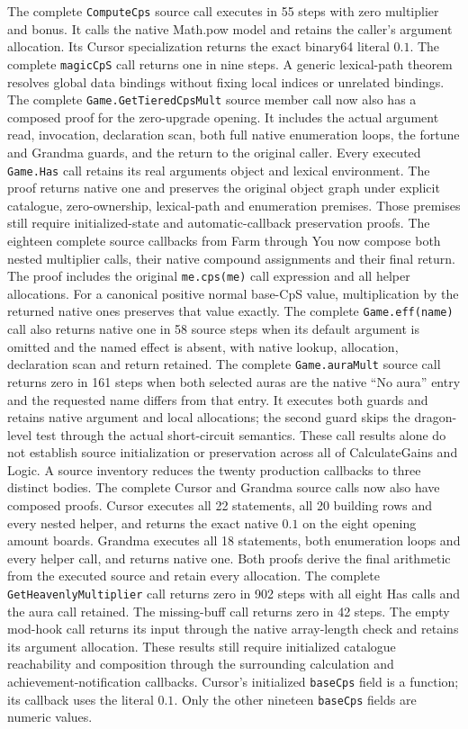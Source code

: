 \documentclass[11pt,a4paper]{article}
\numberwithin{equation}{section}
\theoremstyle{definition}
\theoremstyle{remark}
\begin{document}
The complete \texttt{ComputeCps} source call executes in 55 steps with zero multiplier and bonus. It calls the native Math.pow model and retains the caller's argument allocation. Its Cursor specialization returns the exact binary64 literal $0.1$. The complete \texttt{magicCpS} call returns one in nine steps. A generic lexical-path theorem resolves global data bindings without fixing local indices or unrelated bindings. The complete \texttt{Game.GetTieredCpsMult} source member call now also has a composed proof for the zero-upgrade opening. It includes the actual argument read, invocation, declaration scan, both full native enumeration loops, the fortune and Grandma guards, and the return to the original caller. Every executed \texttt{Game.Has} call retains its real arguments object and lexical environment. The proof returns native one and preserves the original object graph under explicit catalogue, zero-ownership, lexical-path and enumeration premises. Those premises still require initialized-state and automatic-callback preservation proofs. The eighteen complete source callbacks from Farm through You now compose both nested multiplier calls, their native compound assignments and their final return. The proof includes the original \texttt{me.cps(me)} call expression and all helper allocations. For a canonical positive normal base-CpS value, multiplication by the returned native ones preserves that value exactly. The complete \texttt{Game.eff(name)} call also returns native one in 58 source steps when its default argument is omitted and the named effect is absent, with native lookup, allocation, declaration scan and return retained. The complete \texttt{Game.auraMult} source call returns zero in 161 steps when both selected auras are the native ``No aura'' entry and the requested name differs from that entry. It executes both guards and retains native argument and local allocations; the second guard skips the dragon-level test through the actual short-circuit semantics. These call results alone do not establish source initialization or preservation across all of CalculateGains and Logic. A source inventory reduces the twenty production callbacks to three distinct bodies. The complete Cursor and Grandma source calls now also have composed proofs. Cursor executes all 22 statements, all 20 building rows and every nested helper, and returns the exact native $0.1$ on the eight opening amount boards. Grandma executes all 18 statements, both enumeration loops and every helper call, and returns native one. Both proofs derive the final arithmetic from the executed source and retain every allocation. The complete \texttt{GetHeavenlyMultiplier} call returns zero in 902 steps with all eight Has calls and the aura call retained. The missing-buff call returns zero in 42 steps. The empty mod-hook call returns its input through the native array-length check and retains its argument allocation. These results still require initialized catalogue reachability and composition through the surrounding calculation and achievement-notification callbacks. Cursor's initialized \texttt{baseCps} field is a function; its callback uses the literal $0.1$. Only the other nineteen \texttt{baseCps} fields are numeric values.
\end{document}
